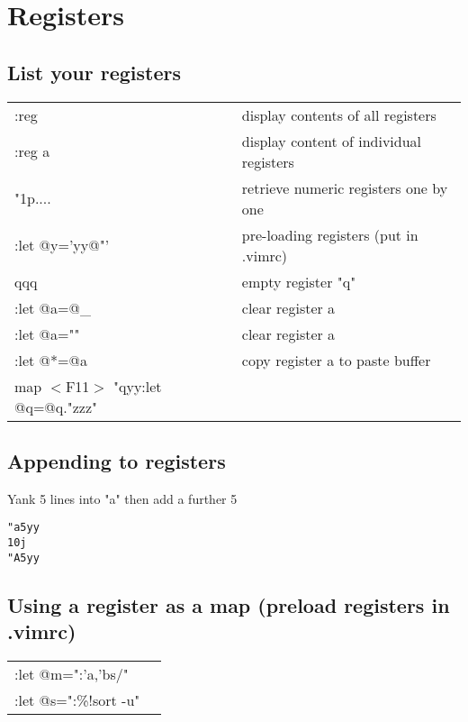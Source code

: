 \section{Registers}

\subsection{List your registers}
\begin{center}
\begin{longtable}{l|l}
:reg & display contents of all registers\\
:reg a & display content of individual registers\\
"1p.... & retrieve numeric registers one by one\\
:let @y='yy@"' & pre-loading registers (put in .vimrc)\\
qqq & empty register "q"\\
:let @a=@\_ & clear register a\\
:let @a="" & clear register a\\
:let @*=@a & copy register a to paste buffer\\
map $<$F11$>$ "qyy:let @q=@q."zzz"
\end{longtable}
\end{center}

\subsection{Appending to registers}

Yank 5 lines into "a" then add a further 5

\begin{verbatim}
"a5yy
10j
"A5yy
\end{verbatim}

\subsection{Using a register as a map (preload registers in .vimrc)}
\begin{center}
\begin{longtable}{l|l}
 :let @m=":'a,'bs/"\\
 :let @s=":\%!sort -u"
 \end{longtable}
\end{center}

